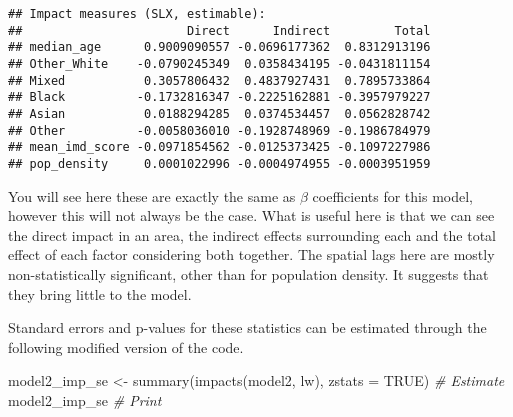\documentclass[
]{book}
\newenvironment{Shaded}{\begin{snugshade}}{\end{snugshade}}
\newcommand{\AttributeTok}[1]{\textcolor[rgb]{0.77,0.63,0.00}{#1}}
\newcommand{\CommentTok}[1]{\textcolor[rgb]{0.56,0.35,0.01}{\textit{#1}}}
\newcommand{\ConstantTok}[1]{\textcolor[rgb]{0.00,0.00,0.00}{#1}}
\newcommand{\FunctionTok}[1]{\textcolor[rgb]{0.00,0.00,0.00}{#1}}
\newcommand{\NormalTok}[1]{#1}
\newcommand{\OtherTok}[1]{\textcolor[rgb]{0.56,0.35,0.01}{#1}}
\begin{document}
\begin{verbatim}
## Impact measures (SLX, estimable):
##                       Direct      Indirect         Total
## median_age      0.9009090557 -0.0696177362  0.8312913196
## Other_White    -0.0790245349  0.0358434195 -0.0431811154
## Mixed           0.3057806432  0.4837927431  0.7895733864
## Black          -0.1732816347 -0.2225162881 -0.3957979227
## Asian           0.0188294285  0.0374534457  0.0562828742
## Other          -0.0058036010 -0.1928748969 -0.1986784979
## mean_imd_score -0.0971854562 -0.0125373425 -0.1097227986
## pop_density     0.0001022996 -0.0004974955 -0.0003951959
\end{verbatim}

You will see here these are exactly the same as \(\beta\) coefficients for this model, however this will not always be the case. What is useful here is that we can see the direct impact in an area, the indirect effects surrounding each and the total effect of each factor considering both together. The spatial lags here are mostly non-statistically significant, other than for population density. It suggests that they bring little to the model.

Standard errors and p-values for these statistics can be estimated through the following modified version of the code.

\begin{Shaded}
\begin{Highlighting}[]
\NormalTok{model2\_imp\_se }\OtherTok{\textless{}{-}} \FunctionTok{summary}\NormalTok{(}\FunctionTok{impacts}\NormalTok{(model2, lw), }\AttributeTok{zstats =} \ConstantTok{TRUE}\NormalTok{) }\CommentTok{\# Estimate}
\NormalTok{model2\_imp\_se }\CommentTok{\# Print}
\end{Highlighting}
\end{Shaded}
\end{document}

